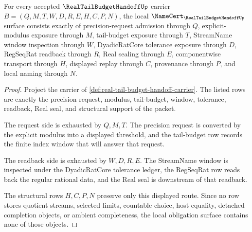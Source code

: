 \begin{theorem}
\label{thm:real-tail-budget-handoff-namecert-obligations}
For every accepted $\RealTailBudgetHandoffUp$ carrier $B=(Q,M,T,W,D,R,E,H,C,P,N)$, the local $\NameCert_{\RealTailBudgetHandoffUp}$ surface consists exactly of precision-request admission through $Q$, explicit-modulus exposure through $M$, tail-budget exposure through $T$, StreamName window inspection through $W$, DyadicRatCore tolerance exposure through $D$, RegSeqRat readback through $R$, Real sealing through $E$, componentwise transport through $H$, displayed replay through $C$, provenance through $P$, and local naming through $N$.
\end{theorem}
\begin{proof}
Project the carrier of \autoref{def:real-tail-budget-handoff-carrier}. The listed rows are exactly the precision request, modulus, tail-budget, window, tolerance, readback, Real seal, and structural support of the packet.

The request side is exhausted by $Q,M,T$. The precision request is converted by the explicit modulus into a displayed threshold, and the tail-budget row records the finite index window that will answer that request.

The readback side is exhausted by $W,D,R,E$. The StreamName window is inspected under the DyadicRatCore tolerance ledger, the RegSeqRat row reads back the regular rational data, and the Real seal is downstream of that readback.

The structural rows $H,C,P,N$ preserve only this displayed route. Since no row stores quotient streams, selected limits, countable choice, host equality, detached completion objects, or ambient completeness, the local obligation surface contains none of those objects.
\end{proof}

